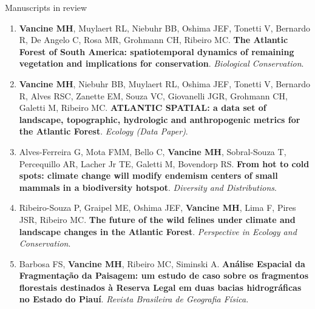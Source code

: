 \documentclass{resume}
\begin{document}
\begin{rSection}{Manuscripts in review}

\begin{enumerate} 

\item {\bf Vancine MH}, Muylaert RL, Niebuhr BB, Oshima JEF, Tonetti V, Bernardo R, De Angelo C, Rosa MR, Grohmann CH, Ribeiro MC. {\bf The Atlantic Forest of South America: spatiotemporal dynamics of remaining vegetation and implications for conservation}. {\it Biological Conservation}.

\item {\bf Vancine MH}, Niebuhr BB, Muylaert RL, Oshima JEF, Tonetti V, Bernardo R, Alves RSC, Zanette EM, Souza VC, Giovanelli JGR, Grohmann CH, Galetti M, Ribeiro MC. {\bf ATLANTIC  SPATIAL:  a  data  set  of  landscape,  topographic,  hydrologic  and  anthropogenic metrics for the Atlantic Forest}. {\it Ecology (Data Paper)}.

\item Alves-Ferreira G, Mota FMM, Bello C, {\bf Vancine MH}, Sobral-Souza T, Percequillo AR, Lacher Jr TE, Galetti M, Bovendorp RS. {\bf From hot to cold spots: climate change will modify endemism centers of small mammals in a biodiversity hotspot}. {\it Diversity and Distributions}.

\item Ribeiro-Souza P, Graipel ME, Oshima JEF, {\bf Vancine MH}, Lima F, Pires JSR, Ribeiro MC. {\bf The future of the wild felines under climate and landscape changes in the Atlantic Forest}. {\it Perspective in Ecology and Conservation}.

\item Barbosa FS, {\bf Vancine MH}, Ribeiro MC, Siminski A. {\bf Análise Espacial da Fragmentação da Paisagem: um estudo de caso sobre os fragmentos florestais destinados à Reserva Legal em duas bacias hidrográficas no Estado do Piauí}. {\it Revista Brasileira de Geografia Física.}

\end{enumerate} 

\end{rSection}

\end{document}
